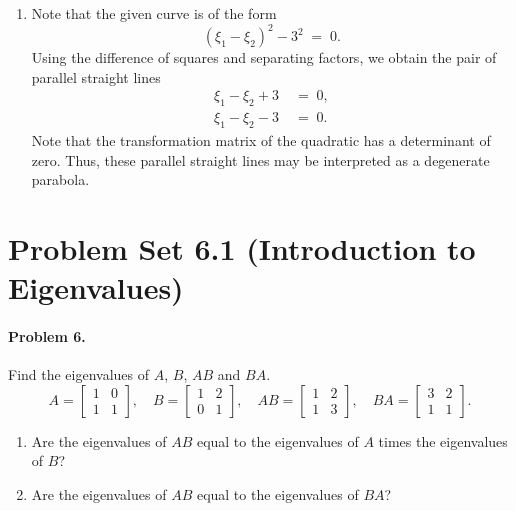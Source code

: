 \documentclass[10pt]{article}
\begin{document}
\begin{enumerate}
                \item 
                Note that the given curve is of the form
                \[
                (\xi_1 - \xi_2)^2 - 3^2 \;=\; 0.
                \]
                Using the difference of squares and separating factors, we obtain the pair of parallel straight lines
                \begin{align*}
                        \xi_1 - \xi_2 + 3 \;&=\; 0, \\
                        \xi_1 - \xi_2 - 3 \;&=\; 0.
                \end{align*}
                Note that the transformation matrix of the quadratic has a determinant of zero.
                Thus, these parallel straight lines may be interpreted as a degenerate parabola.
        \end{enumerate}

        
        \section*{Problem Set 6.1 (Introduction to Eigenvalues)}
        \paragraph{Problem 6.}
        Find the eigenvalues of $A$, $B$, $AB$ and $BA$.
        \[
        A = \begin{bmatrix}
                1 & 0 \\ 1 & 1
        \end{bmatrix}, \quad
        B = \begin{bmatrix}
                1 & 2 \\ 0 & 1
        \end{bmatrix}, \quad
        AB = \begin{bmatrix}
                1 & 2 \\ 1 & 3
        \end{bmatrix}, \quad
        BA = \begin{bmatrix}
                3 & 2 \\ 1 & 1
        \end{bmatrix}.
        \]
        \begin{enumerate}
                \item Are the eigenvalues of $AB$ equal to the eigenvalues of $A$ times the eigenvalues of $B$?
                \item Are the eigenvalues of $AB$ equal to the eigenvalues of $BA$?
        \end{enumerate}
\end{document}
